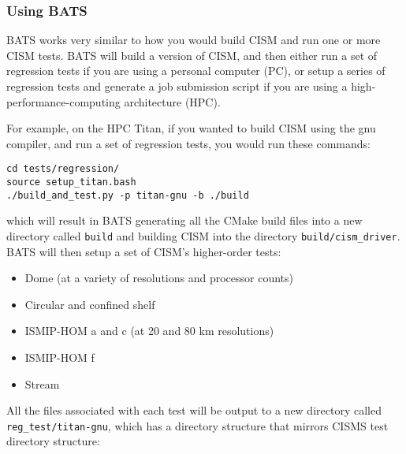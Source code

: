 \subsubsection{Using BATS} 

BATS works very similar to how you would build CISM and run one or more CISM tests. BATS will
build a version of CISM, and then either run a set of regression tests if you are using a personal computer (PC), or
setup a series of regression tests and generate a job submission script if you are using a high-performance-computing
architecture (HPC). 

\par
For example, on the HPC Titan, if you wanted to build CISM using the gnu compiler, and run a set of regression tests,
you would run these commands: 

\begin{verbatim}
cd tests/regression/
source setup_titan.bash
./build_and_test.py -p titan-gnu -b ./build
\end{verbatim}

\noindent
which will result in BATS generating all the CMake build files into a new directory called \texttt{build} and building
CISM into the directory \texttt{build/cism\_driver}. BATS will then setup a set of CISM's higher-order tests:

\begin{itemize}
    \item Dome (at a variety of resolutions and processor counts) \\
    \item Circular and confined shelf \\
    \item ISMIP-HOM a and c (at 20 and 80 km resolutions) \\
    \item ISMIP-HOM f \\
    \item Stream \\
\end{itemize}

\par
All the files associated with each test will be output to a new directory called \texttt{reg\_test/titan-gnu}, which has a
directory structure that mirrors CISMS test directory structure:

